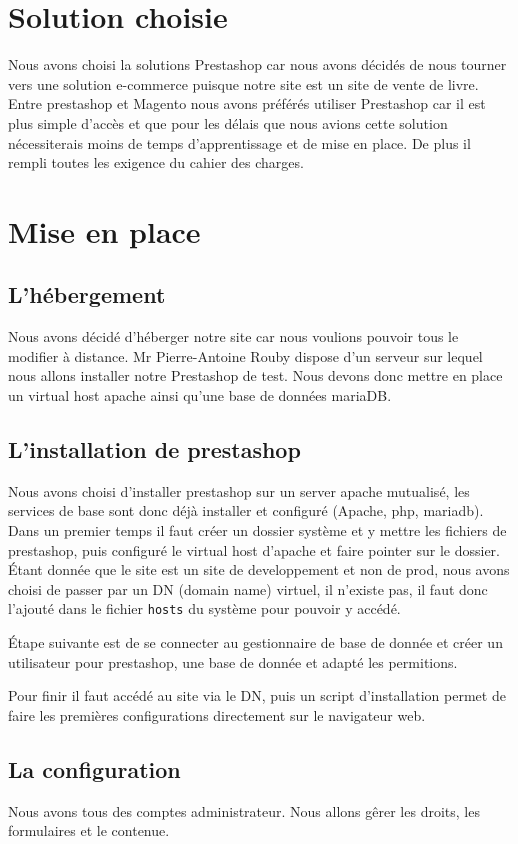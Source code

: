 \documentclass[a4paper,12pt]{report}
\begin{document}
\chapter{Solution choisie}
Nous avons choisi la solutions Prestashop car nous avons décidés de
nous tourner vers une solution e-commerce puisque notre site est un
site de vente de livre.  Entre prestashop et Magento nous avons
préférés utiliser Prestashop car il est plus simple d'accès et que
pour les délais que nous avions cette solution nécessiterais moins de
temps d'apprentissage et de mise en place. De plus il rempli toutes
les exigence du cahier des charges.

\chapter{Mise en place}
\section{L'hébergement}
Nous avons décidé d’héberger notre site car nous voulions pouvoir tous
le modifier à distance. Mr Pierre-Antoine Rouby dispose d'un serveur
sur lequel nous allons installer notre Prestashop de test. Nous devons
donc mettre en place un virtual host apache ainsi qu'une base de données
mariaDB.

\section{L'installation de prestashop}
Nous avons choisi d'installer prestashop sur un server apache mutualisé,
les services de base sont donc déjà installer et configuré (Apache, php,
mariadb).
Dans un premier temps il faut créer un dossier système et y mettre les
fichiers de prestashop, puis configuré le virtual host d'apache et faire
pointer sur le dossier. Étant donnée que le site est un site de
developpement et non de prod, nous avons choisi de passer par un DN (domain
name) virtuel, il n'existe pas, il faut donc l'ajouté dans le fichier
\texttt{hosts} du système pour pouvoir y accédé.

Étape suivante est de se connecter au gestionnaire de base de donnée et créer
un utilisateur pour prestashop, une base de donnée et adapté les permitions.

Pour finir il faut accédé au site via le DN, puis un script d'installation
permet de faire les premières configurations directement sur le navigateur
web.

\section{La configuration}
Nous avons tous des comptes administrateur.
Nous allons gêrer les droits, les formulaires et le contenue.
\end{document}
